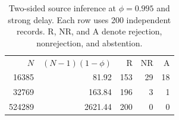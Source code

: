 \begin{table}[t]
\caption{Two-sided source inference at $\phi=0.995$ and strong delay. Each row uses 200 independent records. R, NR, and A denote rejection, nonrejection, and abstention.}\label{tab:source-outcomes}
\begin{ruledtabular}\begin{tabular}{rrrrr}
$N$ & $(N-1)(1-\phi)$ & R & NR & A\\
16385 & 81.92 &153&29&18\\
32769 &163.84&196&3&1\\
524289&2621.44&200&0&0\\
\end{tabular}\end{ruledtabular}
\end{table}
